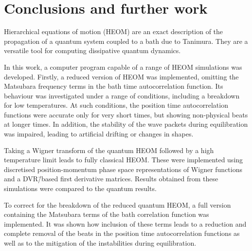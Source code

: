 \chapter{Conclusions and further work}
%
Hierarchical equations of motion (HEOM) are an exact description of the propagation of a quantum system coupled to a bath due to Tanimura. They are a versatile tool for computing dissipative quantum dynamics.\supercite{Tanimura1990a,Tanimura1991a,Tanimura1992,Tanimura2006a}

In this work, a computer program capable of a range of HEOM simulations was developed. Firstly, a reduced version of HEOM was implemented, omitting the Matsubara frequency terms in the bath time autocorrelation function. Its behaviour was investigated under a range of conditions, including a breakdown for low temperatures. At such conditions, the position time autocorrelation functions were accurate only for very short times, but showing non-physical beats at longer times. In addition, the stability of the wave packets during equilibration was impaired, leading to artificial drifting or changes in shapes.

Taking a Wigner transform of the quantum HEOM followed by a high temperature limit leads to fully classical HEOM.\supercite{Tanimura1991a} These were implemented using discretised position-momentum phase space representations of Wigner functions and a DVR\=/based first derivative matrices. Results obtained from these simulations were compared to the quantum results.

To correct for the breakdown of the reduced quantum HEOM, a full version containing the Matsubara terms of the bath correlation function\supercite{Shi2009a} was implemented. It was shown how inclusion of these terms leads to a reduction and complete removal of the beats in the position time autocorrelation functions as well as to the mitigation of the instabilities during equilibration.

